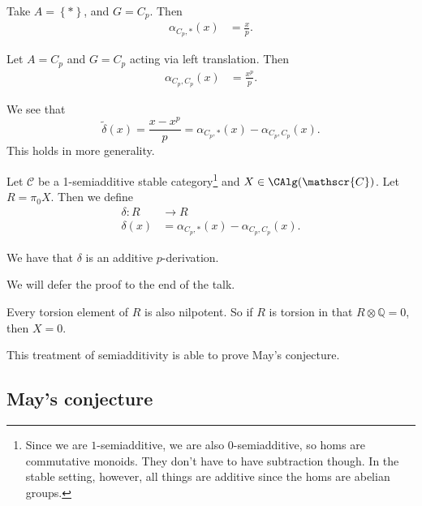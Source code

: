 \begin{example} Take $A= \left\{ \ast \right\}$, and $G = C_p$. Then
\begin{align*}
    \alpha_{C_p,\ast}(x) &= \frac{x}{p}.
\end{align*}
\end{example}

\begin{example} Let $A = C_p$ and $G = C_p$ acting via left translation. Then
\begin{align*}
    \alpha_{C_p,C_p}(x) &= \frac{x^p}{p}.
\end{align*}
\end{example}

\begin{corollary} We see that 
\[\widetilde{\delta}(x) = \frac{x - x^p}{p} = \alpha_{C_p,\ast}(x) - \alpha_{C_p,C_p}(x).\]
This holds in more generality.
\end{corollary}

\begin{definition} Let $\mathscr{C}$ be a 1-semiadditive stable category\footnote{Since we are $1$-semiadditive, we are also 0-semiadditive, so homs are commutative monoids. They don't have to have subtraction though. In the stable setting, however, all things are additive since the homs are abelian groups.} and $X\in \CAlg(\mathscr{C})$. Let $R = \pi_0 X$. Then we define
\begin{align*}
    \delta : R &\to R \\
    \delta(x) &= \alpha_{C_p,\ast}(x) - \alpha_{C_p,C_p}(x).
\end{align*}
\end{definition}

\begin{theorem} We have that $\delta$ is an additive $p$-derivation.
\end{theorem}

We will defer the proof to the end of the talk.

\begin{corollary} Every torsion element of $R$ is also nilpotent. So if $R$ is torsion in that $R \otimes \mathbb{Q} = 0$, then $X = 0$.
\end{corollary}

This treatment of semiadditivity is able to prove May's conjecture.

\subsection{May's conjecture}


